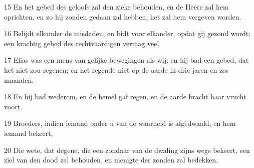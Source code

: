 \par 15 En het gebed des geloofs zal den zieke behouden, en de Heere zal hem oprichten, en zo hij zonden gedaan zal hebben, het zal hem vergeven worden.
\par 16 Belijdt elkander de misdaden, en bidt voor elkander, opdat gij gezond wordt; een krachtig gebed des rechtvaardigen vermag veel.
\par 17 Elias was een mens van gelijke bewegingen als wij; en hij bad een gebed, dat het niet zou regenen; en het regende niet op de aarde in drie jaren en zes maanden.
\par 18 En hij bad wederom, en de hemel gaf regen, en de aarde bracht haar vrucht voort.
\par 19 Broeders, indien iemand onder u van de waarheid is afgedwaald, en hem iemand bekeert,
\par 20 Die wete, dat degene, die een zondaar van de dwaling zijns wegs bekeert, een ziel van den dood zal behouden, en menigte der zonden zal bedekken.



